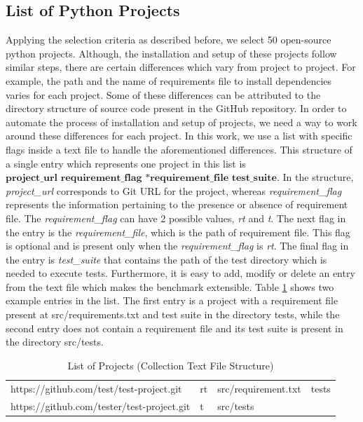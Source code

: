 \subsection{List of Python Projects}
\label{approach:list of projects}
Applying the selection criteria as described before, we select 50 open-source python projects.
Although, the installation and setup of these projects follow similar steps, there are certain differences which vary from project to project.
For example, the path and the name of requirements file to install dependencies varies for each project.
Some of these differences can be attributed to the directory structure of source code present in the GitHub repository.
In order to automate the process of installation and setup of projects, we need a way to work around these differences for each project.
In this work, we use a list with specific flags inside a text file to handle the aforementioned differences.
This structure of a single entry  which represents one project in this list is $ \textbf{project\_url requirement\_flag *requirement\_file test\_suite} $.
In the structure, \textit{project\_url} corresponds to Git URL for the project, whereas \textit{requirement\_flag} represents the information pertaining to the presence or absence of requirement file.
The \textit{requirement\_flag} can have 2 possible values, \textit{rt} and \textit{t}.
The next flag in the entry is the \textit{requirement\_file}, which is the path of requirement file. 
This flag is optional and is present only when the \textit{requirement\_flag} is \textit{rt}.
The final flag in the entry is \textit{test\_suite} that contains the path of the test directory which is needed to execute tests.
Furthermore, it is easy to add, modify or delete an entry from the text file which makes the benchmark extensible.
Table \ref{table:list of projects} shows two example entries in the list.
The first entry is a project with a requirement file present at src/requirements.txt and test suite in the directory tests, while the second entry does not contain a requirement file and its test suite is present in the directory src/tests.

\begin{table}[ht]
    \centering
    \begin{tabular}{llll}
    \hline
    https://github.com/test/test-project.git & rt & src/requirement.txt & tests\\
    https://github.com/tester/test-project.git & t & src/tests\\
    \hline
    \end{tabular}
    \caption{List of Projects (Collection Text File Structure)}
    \label{table:list of projects}
\end{table}

